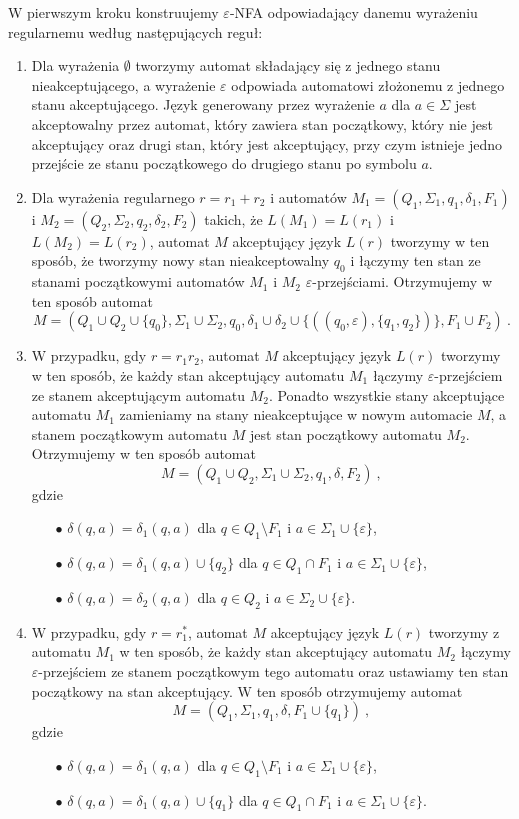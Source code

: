 W pierwszym kroku konstruujemy $\varepsilon$-NFA odpowiadający danemu wyrażeniu regularnemu według następujących reguł:
\begin{enumerate}
    \item Dla wyrażenia $\emptyset$ tworzymy automat składający się z jednego stanu nieakceptującego, a wyrażenie $\varepsilon$ odpowiada automatowi złożonemu z jednego stanu akceptującego. Język generowany przez wyrażenie $a$ dla $a\in\Sigma$ jest akceptowalny przez automat, który zawiera stan początkowy, który nie jest akceptujący oraz drugi stan, który jest akceptujący, przy czym istnieje jedno przejście ze stanu początkowego do drugiego stanu po symbolu $a$.
    \item Dla wyrażenia regularnego $r=r_1+r_2$ i automatów $M_1=(Q_1, \Sigma_1, q_1, \delta_1, F_1)$ i $M_2=(Q_2, \Sigma_2, q_2, \delta_2, F_2)$ takich, że $L(M_1)=L(r_1)$ i $L(M_2)=L(r_2)$, automat $M$ akceptujący język $L(r)$ tworzymy w ten sposób, że tworzymy nowy stan nieakceptowalny $q_0$ i łączymy ten stan ze stanami początkowymi automatów $M_1$ i $M_2$ $\varepsilon$-przejściami. Otrzymujemy w ten sposób automat $$M=(Q_1\cup Q_2 \cup \{q_0\}, \Sigma_1\cup\Sigma_2, q_0, \delta_1\cup\delta_2\cup\{((q_0,\varepsilon),\{q_1,q_2\})\}, F_1\cup F_2)~.$$
    \item W przypadku, gdy $r=r_1 r_2$, automat $M$ akceptujący język $L(r)$ tworzymy w ten sposób, że każdy stan akceptujący automatu $M_1$ łączymy $\varepsilon$-przejściem ze stanem akceptującym automatu $M_2$. Ponadto wszystkie stany akceptujące automatu $M_1$ zamieniamy na stany nieakceptujące w nowym automacie $M$, a stanem początkowym automatu $M$ jest stan początkowy automatu $M_2$. Otrzymujemy w ten sposób automat
    $$M=(Q_1\cup Q_2,\Sigma_1\cup\Sigma_2,q_1,\delta,F_2)~,$$
    gdzie
    \begin{itemize}
        \item[$\bullet$] $\delta(q,a)=\delta_1(q,a)$ dla $q\in Q_1\setminus F_1$ i $a\in\Sigma_1\cup\{\varepsilon\}$,
        \item[$\bullet$] $\delta(q,a)=\delta_1(q,a)\cup\{q_2\}$ dla $q\in Q_1\cap F_1$ i $a\in\Sigma_1\cup\{\varepsilon\}$,
        \item[$\bullet$] $\delta(q,a)=\delta_2(q,a)$ dla $q\in Q_2$ i $a\in\Sigma_2\cup\{\varepsilon\}$.
    \end{itemize}
    \item W przypadku, gdy $r=r_1^*$, automat $M$ akceptujący język $L(r)$ tworzymy z automatu $M_1$ w ten sposób, że każdy stan akceptujący automatu $M_2$ łączymy $\varepsilon$-przejściem ze stanem początkowym tego automatu oraz ustawiamy ten stan początkowy na stan akceptujący. W ten sposób otrzymujemy automat
    $$M=(Q_1,\Sigma_1,q_1,\delta,F_1\cup\{q_1\})~,$$
    gdzie
    \begin{itemize}
        \item[$\bullet$] $\delta(q,a)=\delta_1(q,a)$ dla $q\in Q_1\setminus F_1$ i $a\in\Sigma_1\cup\{\varepsilon\}$,
        \item[$\bullet$] $\delta(q,a)=\delta_1(q,a)\cup\{q_1\}$ dla $q\in Q_1\cap F_1$ i $a\in\Sigma_1\cup\{\varepsilon\}$.
    \end{itemize}
\end{enumerate}

